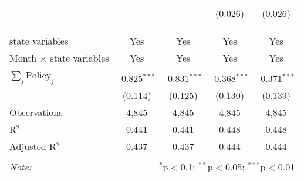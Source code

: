 \begin{tabular}{@{\extracolsep{1pt}}lcccc}
  &  &  & (0.026) & (0.026) \\ 
   &  &  &  &  \\ 
  &  &  &  &  \\ 
 \hline \\[-1.8ex] 
state variables & Yes & Yes & Yes & Yes \\ 
Month $\times$ state variables & Yes & Yes & Yes & Yes \\ 
\hline \\[-1.8ex] 
$\sum_j \mathrm{Policy}_j$ & -0.825$^{***}$ & -0.831$^{***}$ & -0.368$^{***}$ & -0.371$^{***}$ \\ 
 & (0.114) & (0.125) & (0.130) & (0.139) \\ 
Observations & 4,845 & 4,845 & 4,845 & 4,845 \\ 
R$^{2}$ & 0.441 & 0.441 & 0.448 & 0.448 \\ 
Adjusted R$^{2}$ & 0.437 & 0.437 & 0.444 & 0.444 \\ 
\hline 
\hline \\[-1.8ex] 
\textit{Note:}  & \multicolumn{4}{r}{$^{*}$p$<$0.1; $^{**}$p$<$0.05; $^{***}$p$<$0.01} \\ 
\end{tabular} 